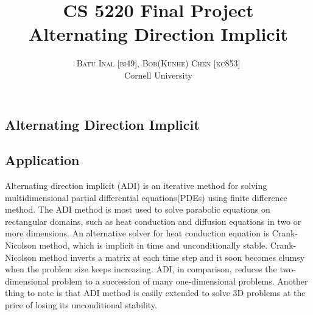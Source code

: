 \documentclass[a4paper,11pt]{article}
\title{\vspace{-15mm}\fontsize{24pt}{10pt}\selectfont\textbf{CS 5220 Final Project \\ \Large Alternating Direction Implicit}} %
\author{
\large
\textsc{Batu Inal [bi49], Bob(Kunhe) Chen [kc853]}\\
\normalsize Cornell University \\ %
[2mm] 
\vspace{-20mm}
}
\date{}
\begin{document}
\setlength{\textwidth}{500pt}
\maketitle %
\thispagestyle{fancy} %
\begin{abstract}
\noindent %
\end{abstract}
\begin{multicols}{2}
\section{Alternating Direction Implicit}
	\subsection{Application}
	Alternating direction implicit (ADI) is an iterative method for solving multidimensional partial differential equations(PDEs) using finite difference method. The ADI method is most used to solve parabolic equations on rectangular domains, such as heat conduction and diffusion equations in two or more dimensions. An alternative solver for heat conduction equation is Crank-Nicolson method, which is implicit in time and  unconditionally stable.  Crank-Nicolson method inverts a matrix at each time step and it soon becomes clumsy when the problem size keeps increasing. ADI, in comparison, reduces the two-dimensional problem to a succession of many one-dimensional problems. Another thing to note is that ADI method is easily extended to solve 3D problems at the price of losing its unconditional stability.

\end{multicols}
\end{document}
